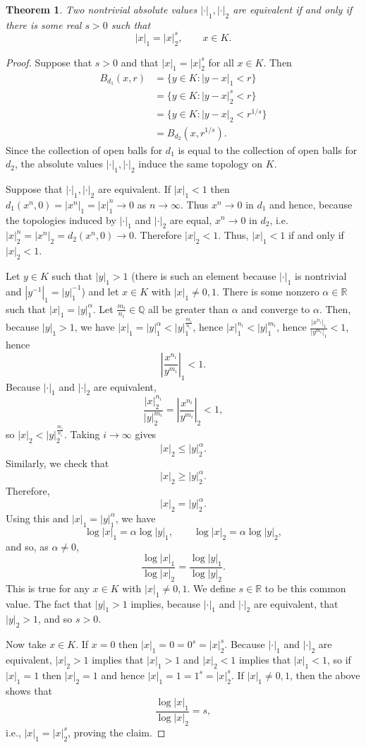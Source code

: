 \documentclass{article}
\theoremstyle{plain}
\newtheorem{theorem}{Theorem}
\theoremstyle{definition}
\begin{document}
\begin{theorem}
Two nontrivial absolute values $|\cdot|_1,|\cdot|_2$ are equivalent if and only if there is some  real $s>0$
such that
\[
|x|_1=|x|_2^s, \qquad x \in K.
\]
\label{equivalent}
\end{theorem}
\begin{proof}
Suppose that $s>0$ and that $|x|_1=|x|_2^s$ for all $x \in K$. Then
\begin{align*}
B_{d_1}(x,r) &= \{y \in K: |y-x|_1 < r\}\\
&=\{y \in K: |y-x|_2^s < r\}\\
&=\{y \in K: |y-x|_2 < r^{1/s}\}\\
&=B_{d_2}(x,r^{1/s}).
\end{align*}
Since the collection of open balls for $d_1$ is equal to the collection of open balls for $d_2$, the absolute values $|\cdot|_1,|\cdot|_2$ induce the same
topology on $K$. 

Suppose that $|\cdot|_1,|\cdot|_2$ are equivalent.
If $|x|_1<1$ then $d_1(x^n,0)=|x^n|_1= |x|_1^n   \to 0$ as $n \to \infty$. Thus $x^n \to 0$ in $d_1$ and
hence, because the topologies induced by $|\cdot|_1$ and $|\cdot|_2$ are equal,
$x^n \to 0$ in $d_2$, i.e. $|x|_2^n = |x^n|_2 = d_2(x^n,0) \to 0$. Therefore $|x|_2<1$. Thus, $|x|_1 < 1$ if and only if 
$|x|_2 < 1$. 

Let $y \in K$ such that $|y|_1>1$ (there is such an element because $|\cdot|_1$ is nontrivial and
 $|y^{-1}|_1 = |y|_1^{-1}$) and
let $x \in K$ with $|x|_1 \neq 0, 1$. There is some nonzero $\alpha \in \mathbb{R}$ such that $|x|_1=|y|_1^\alpha$. 
Let $\frac{m_i}{n_i} \in \mathbb{Q}$ all be greater than $\alpha$ and converge to $\alpha$. 
Then, because $|y|_1>1$,
we have $|x|_1 = |y|_1^\alpha < |y|_1^{\frac{m_i}{n_i}}$, hence
$|x|_1^{n_i} < |y|_1^{m_i}$, hence
$\frac{|x^{n_i}|_1}{ |y^{m_i}|_1}<1$, hence
\[
\left| \frac{x^{n_i}}{y^{m_i}} \right|_1 < 1.
\]
Because $|\cdot|_1$ and $|\cdot|_2$ are equivalent, 
\[
\frac{|x|_2^{n_i}}{|y|_2^{m_i}}
=
 \left| \frac{x^{n_i}}{y^{m_i}} \right|_2 < 1,
\]
so $|x|_2<|y|_2^{\frac{m_i}{n_i}}$. Taking $i \to \infty$ gives
\[
|x|_2 \leq |y|_2^\alpha.
\]
Similarly, we check that 
\[
|x|_2 \geq |y|_2^\alpha.
\]
Therefore,
\[
|x|_2 = |y|_2^\alpha.
\]
Using this and $|x|_1=|y|_1^\alpha$, we have
\[
\log |x|_1 = \alpha \log |y|_1, \qquad \log |x|_2 = \alpha \log |y|_2,
\]
and so, as $\alpha \neq 0$,
\[
\frac{\log |x|_1}{\log |x|_2} = \frac{\log |y|_1}{\log |y|_2}.
\]
This is true for any $x \in K$ with $|x|_1 \neq 0, 1$. We define $s \in \mathbb{R}$ to be this common value. The fact that
$|y|_1>1$ implies, because $|\cdot|_1$ and $|\cdot|_2$ are equivalent, that $|y|_2>1$, and so
$s>0$. 

Now take $x \in K$. If $x=0$ then $|x|_1=0=0^s=|x|_2^s$. Because $|\cdot|_1$ and $|\cdot|_2$ are equivalent, $|x|_2 >1$ implies that
$|x|_1>1$ and $|x|_2<1$ implies that $|x|_1<1$, so if $|x|_1=1$ then $|x|_2=1$ and hence
$|x|_1 =1=1^s= |x|_2^s$. If $|x|_1 \neq 0, 1$, then the above shows that
\[
\frac{\log |x|_1}{\log |x|_2} = s,
\]
i.e., $|x|_1 = |x|_2^s$, proving the claim.
\end{proof}
\end{document}
